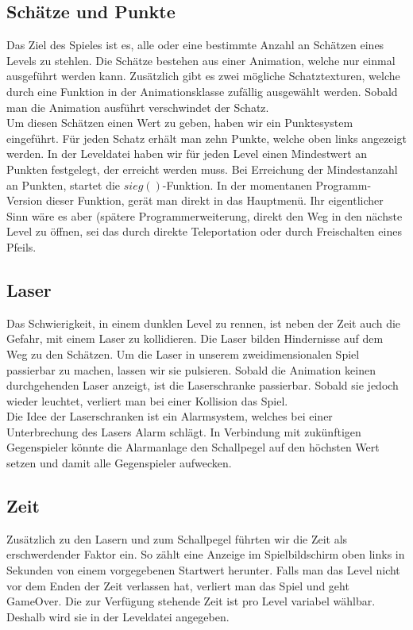 \documentclass[11pt,a4paper]{scrbook}
\begin{document}
\subsection{Schätze und Punkte}
\label{Schaetze}
Das Ziel des Spieles ist es, alle oder eine bestimmte Anzahl an Schätzen eines Levels zu stehlen.
Die Schätze bestehen aus einer Animation, welche nur einmal ausgeführt werden kann.
Zusätzlich gibt es zwei mögliche Schatztexturen, welche durch eine Funktion in der Animationsklasse zufällig ausgewählt werden.
Sobald man die Animation ausführt verschwindet der Schatz.
\\
Um diesen Schätzen einen Wert zu geben, haben wir ein Punktesystem eingeführt.
Für jeden Schatz erhält man zehn Punkte, welche oben links angezeigt werden.
In der Leveldatei haben wir für jeden Level einen Mindestwert an Punkten festgelegt, der erreicht werden muss.
Bei Erreichung der Mindestanzahl an Punkten, startet die $sieg()$-Funktion.
In der momentanen Programm-Version dieser Funktion, gerät man direkt in das Hauptmenü.
Ihr eigentlicher Sinn wäre es aber (spätere Programmerweiterung, direkt den Weg in den nächste Level zu öffnen, sei das durch direkte Teleportation oder durch Freischalten eines Pfeils.    

\subsection{Laser}
Das Schwierigkeit, in einem dunklen Level zu rennen, ist neben der Zeit auch die Gefahr, mit einem Laser zu kollidieren.
Die Laser bilden Hindernisse auf dem Weg zu den Schätzen.
Um die Laser in unserem zweidimensionalen Spiel passierbar zu machen, lassen wir sie pulsieren.
Sobald die Animation keinen durchgehenden Laser anzeigt, ist die Laserschranke passierbar.
Sobald sie jedoch wieder leuchtet, verliert man bei einer Kollision das Spiel.
\\
Die Idee der Laserschranken ist ein Alarmsystem, welches bei einer Unterbrechung des Lasers Alarm schlägt. In Verbindung mit zukünftigen Gegenspieler könnte die Alarmanlage den Schallpegel auf den höchsten Wert setzen und damit alle Gegenspieler aufwecken.

\subsection{Zeit}
\label{zeitlimite}
Zusätzlich zu den Lasern und zum Schallpegel führten wir die Zeit als erschwerdender Faktor ein. 
So zählt eine Anzeige im Spielbildschirm oben links in Sekunden von einem vorgegebenen Startwert herunter. Falls man das Level nicht vor dem Enden der Zeit verlassen hat, verliert man das Spiel und geht GameOver. Die zur Verfügung stehende Zeit ist pro Level variabel wählbar. Deshalb wird sie in der Leveldatei angegeben.
    
\end{document}
